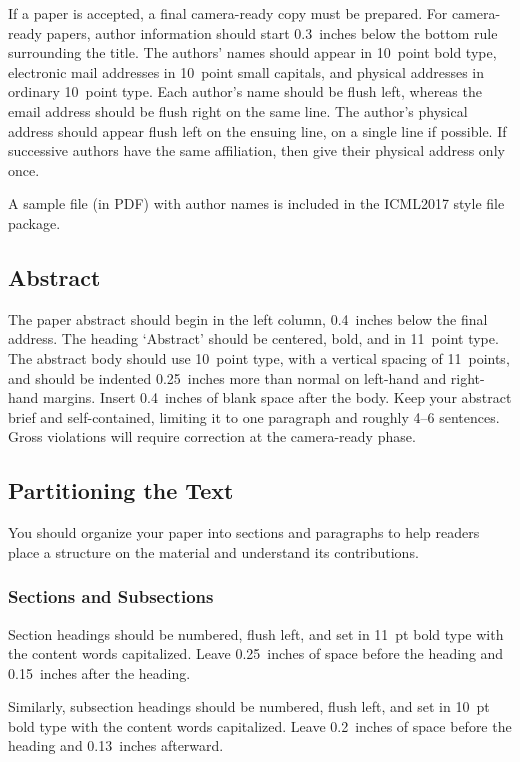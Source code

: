 \documentclass{article}
\begin{document}
If a paper is accepted, a final camera-ready copy must be prepared.
%
For camera-ready papers, author information should start 0.3~inches
below the bottom rule surrounding the title. The authors' names should
appear in 10~point bold type, electronic mail addresses in 10~point
small capitals, and physical addresses in ordinary 10~point type.
Each author's name should be flush left, whereas the email address
should be flush right on the same line. The author's physical address
should appear flush left on the ensuing line, on a single line if
possible. If successive authors have the same affiliation, then give
their physical address only once.

A sample file (in PDF) with author names is included in the ICML2017 
style file package.

\subsection{Abstract}

The paper abstract should begin in the left column, 0.4~inches below
the final address. The heading `Abstract' should be centered, bold,
and in 11~point type. The abstract body should use 10~point type, with
a vertical spacing of 11~points, and should be indented 0.25~inches
more than normal on left-hand and right-hand margins. Insert
0.4~inches of blank space after the body. Keep your abstract brief and 
self-contained,
limiting it to one paragraph and roughly 4--6 sentences.  Gross violations will require correction at the camera-ready phase.

\subsection{Partitioning the Text} 

You should organize your paper into sections and paragraphs to help
readers place a structure on the material and understand its
contributions.

\subsubsection{Sections and Subsections}

Section headings should be numbered, flush left, and set in 11~pt bold
type with the content words capitalized. Leave 0.25~inches of space
before the heading and 0.15~inches after the heading.

Similarly, subsection headings should be numbered, flush left, and set
in 10~pt bold type with the content words capitalized. Leave
0.2~inches of space before the heading and 0.13~inches afterward.
\end{document}
